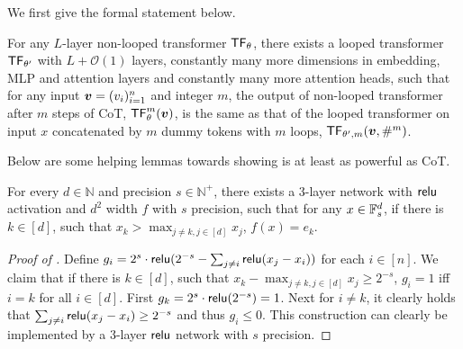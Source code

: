 \iffalse
\begin{theorem}[Informal]\label{thm:cot_informal}
    For any $L$-layer non-looped transformer $\transformer_\theta$, there exists a looped transformer with parameter $\theta'$ and $L+\mathcal{O}(1)$ layers, such that for any input $\vx$ and integer $m$,  the output of non-looped transformer after $m$ steps of CoT is the same as that of the looped transformer on input $x$ concatenated by $m$ dummy tokens with $m$ loops.
\end{theorem}
\fi




We first give the formal statement below.
\begin{theorem}\label{thm:cot_formal}
    For any $L$-layer non-looped transformer $\transformer_\theta$, there exists a looped transformer $\mathsf{TF}_{\theta'}$ with $L+\mathcal{O}(1)$ layers, constantly many more dimensions in embedding, MLP and attention layers and constantly many more attention heads, such that for any input ${\bm{v}}= (v_i)_{i=1}^n$ and integer $m$, the output of non-looped transformer after $m$ steps of CoT, $\mathsf{TF}^m_\theta({\bm{v}})$, is the same as that of the looped transformer on input $x$ concatenated by $m$ dummy tokens with $m$ loops, $\mathsf{TF}_{\theta',m}({\bm{v}},\#^m)$.
\end{theorem}


Below are some helping lemmas towards showing  is at least as powerful as CoT.
\begin{lemma}\label{lem:simulating_hard_argmax}
    For every $d\in \mathbb{N}$ and precision $s\in\mathbb{N}^+$, there exists a 3-layer network with $\mathsf{relu}$ activation and $d^2$ width $f$ with $s$ precision, such that for any $x\in\mathbb{F}_s^d$, if there is $k\in [d]$, such that $x_k >\max_{j\neq k,j\in [d]}x_j$, $f(x) = e_k$. 
\end{lemma}


\begin{proof}[Proof of ]
    Define $g_i = 2^s\cdot \mathsf{relu}(2^{-s} - \sum_{j\neq i}\mathsf{relu}(x_j-x_i))$ for each $i\in [n]$. We claim that if there is $k\in [d]$, such that $x_k -\max_{j\neq k,j\in [d]}x_j\ge 2^{-s}$, $g_i = 1$ iff $i=k$ for all $i\in [d]$. First $g_k =2^s\cdot \mathsf{relu}(2^{-s}) =1 $. Next for $i\neq k$, it clearly holds that  $\sum_{j\neq i}\mathsf{relu}(x_j-x_i)\ge 2^{-s}$ and thus $g_i\le 0$. 
    This construction can clearly be implemented by a 3-layer $\mathsf{relu}$ network with $s$ precision.
\end{proof}

